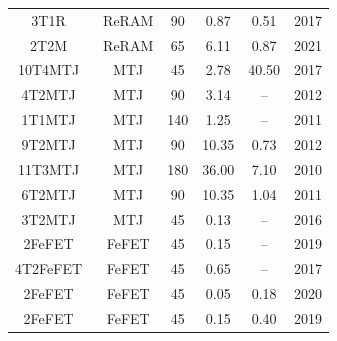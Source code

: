 \begin{table}[t]
\begin{tabular}{cccccc}
3T1R~\cite{ReRAM_6} & ReRAM & 90 & 0.87 & 0.51 & 2017 \\
2T2M~\cite{ReRAM_7} & ReRAM & 65 & 6.11 & 0.87 & 2021 \\
10T4MTJ~\cite{MTJ_1} & MTJ & 45 & 2.78 & 40.50 & 2017 \\
4T2MTJ~\cite{MTJ_2} & MTJ & 90 & 3.14 & -- & 2012 \\
1T1MTJ~\cite{MTJ_3} & MTJ & 140 & 1.25 & -- & 2011 \\
9T2MTJ~\cite{MTJ_4} & MTJ & 90 & 10.35 & 0.73 & 2012 \\
11T3MTJ~\cite{MTJ_5} & MTJ & 180 & 36.00 & 7.10 & 2010 \\
6T2MTJ~\cite{MTJ_6} & MTJ & 90 & 10.35 & 1.04 & 2011 \\
3T2MTJ~\cite{MTJ_7} & MTJ & 45 & 0.13 & -- & 2016 \\
2FeFET~\cite{FeFET_1} & FeFET & 45 & 0.15 & -- & 2019 \\
4T2FeFET~\cite{FeFET_2} & FeFET & 45 & 0.65 & -- & 2017 \\
2FeFET~\cite{FeFET_3} & FeFET & 45 & 0.05 & 0.18 & 2020 \\
2FeFET~\cite{FeFET_4} & FeFET & 45 & 0.15 & 0.40 & 2019 \\
\hline
\end{tabular}
\end{table}
